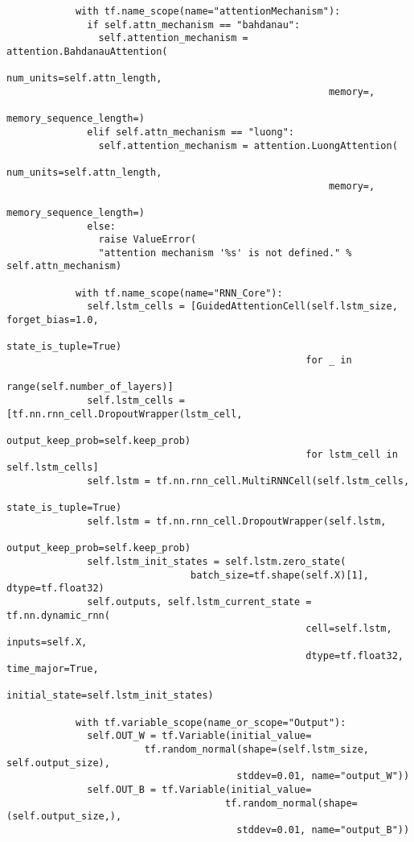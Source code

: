\begin{latin}
\begin{verbatim}
            with tf.name_scope(name="attentionMechanism"):
              if self.attn_mechanism == "bahdanau":
                self.attention_mechanism = attention.BahdanauAttention(
                                                        num_units=self.attn_length,
                                                        memory=,
                                                        memory_sequence_length=)
              elif self.attn_mechanism == "luong":
                self.attention_mechanism = attention.LuongAttention(
                                                        num_units=self.attn_length,
                                                        memory=,
                                                        memory_sequence_length=)
              else:
                raise ValueError(
                "attention mechanism '%s' is not defined." % self.attn_mechanism)

            with tf.name_scope(name="RNN_Core"):
              self.lstm_cells = [GuidedAttentionCell(self.lstm_size, forget_bias=1.0,
                                                    state_is_tuple=True)
                                                    for _ in 
                                                    range(self.number_of_layers)]
              self.lstm_cells = [tf.nn.rnn_cell.DropoutWrapper(lstm_cell,
                                                    output_keep_prob=self.keep_prob)
                                                    for lstm_cell in self.lstm_cells]
              self.lstm = tf.nn.rnn_cell.MultiRNNCell(self.lstm_cells, 
                                                    state_is_tuple=True)
              self.lstm = tf.nn.rnn_cell.DropoutWrapper(self.lstm, 
                                            output_keep_prob=self.keep_prob)
              self.lstm_init_states = self.lstm.zero_state(
                                batch_size=tf.shape(self.X)[1], dtype=tf.float32)
              self.outputs, self.lstm_current_state = tf.nn.dynamic_rnn(
                                                    cell=self.lstm, inputs=self.X,
                                                    dtype=tf.float32, time_major=True,
                                                    initial_state=self.lstm_init_states)

            with tf.variable_scope(name_or_scope="Output"):
              self.OUT_W = tf.Variable(initial_value=
                        tf.random_normal(shape=(self.lstm_size, self.output_size),
                                        stddev=0.01, name="output_W"))
              self.OUT_B = tf.Variable(initial_value=
                                      tf.random_normal(shape=(self.output_size,),
                                        stddev=0.01, name="output_B"))


\end{verbatim}
\end{latin}
